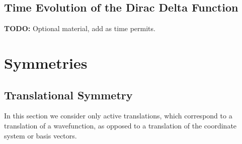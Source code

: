 \documentclass[11pt, a4paper]{article}
\begin{document}
\subsection{Time Evolution of the Dirac Delta Function}
\textbf{TODO:} Optional material, add as time permits.

\newpage
\section{Symmetries}


\subsection{Translational Symmetry}
In this section we consider only active translations, which correspond to a translation of a wavefunction, as opposed to a translation of the coordinate system or basis vectors. 
\end{document}
